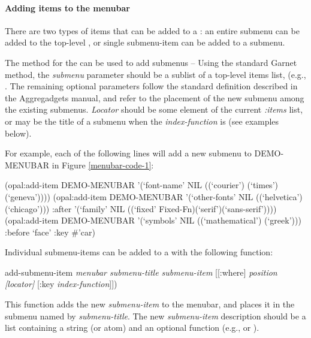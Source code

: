 \paragraph{Adding items to the menubar}

There are two types of items that can be added to a :  an entire
submenu can be added to the top-level , or single submenu-item can
be added to a submenu.

The  method for the  can be used to add submenus --
Using the standard Garnet method, the {\it submenu}
parameter should be a sublist of a top-level items list,
\newline{} (e.g., .
The remaining
optional parameters follow the standard  definition described in
the Aggregadgets manual, and refer to the placement of the new submenu among
the existing submenus.  {\it Locator} should be some element of the current
{\it :items} list, or may be the title of a submenu when the {\it index-function}
is  (see examples below).

For example, each of the following lines will add a new submenu to
DEMO-MENUBAR in Figure \ref{menubar-code-1}:
\begin{programexample}
(opal:add-item DEMO-MENUBAR '(`font-name' NIL ((`courier') (`times') (`geneva'))))
(opal:add-item DEMO-MENUBAR
               '(`other-fonts' NIL ((`helvetica') (`chicago')))
	       :after '(`family' NIL ((`fixed' Fixed-Fn)(`serif')(`sans-serif'))))
(opal:add-item DEMO-MENUBAR
               '(`symbols' NIL ((`mathematical') (`greek')))
	       :before `face' :key \#'car)
\end{programexample}

Individual submenu-items can be added to a  with the following
function:
\begin{programexample}
add-submenu-item {\it menubar submenu-title submenu-item} [[:where] {\it position [locator]} [:key {\it index-function}]])
\end{programexample}
This function adds the new {\it submenu-item} to the menubar, and places it in
the submenu named by {\it submenu-title}.  The new {\it submenu-item} description
should be a list containing a string (or atom) and an optional function
(e.g.,  or ).

